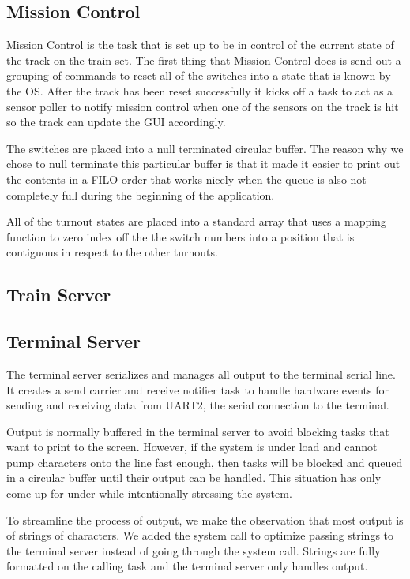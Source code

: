 \documentclass[pdftex,10pt,a4paper]{article}
\begin{document}
\subsection*{Mission Control}

Mission Control is the task that is set up to be in control of the current
state of the track on the train set. The first thing that Mission Control
does is send out a grouping of commands to reset all of the switches into a
state that is known by the OS. After the track has been reset successfully
it kicks off a task to act as a sensor poller to notify mission control when
one of the sensors on the track is hit so the track can update the GUI
accordingly.

The switches are placed into a null terminated circular buffer. The reason why
we chose to null terminate this particular buffer is that it made it easier to
print out the contents in a FILO order that works nicely when the queue is
also not completely full during the beginning of the application.

All of the turnout states are placed into a standard array that uses a mapping
function to zero index off the the switch numbers into a position that is
contiguous in respect to the other turnouts.

\subsection*{Train Server}

\subsection*{Terminal Server}

The terminal server serializes and manages all output to the terminal
serial line. It creates a send carrier and receive notifier task to
handle hardware events for sending and receiving data from UART2, the
serial connection to the terminal.

Output is normally buffered in the terminal server to avoid blocking
tasks that want to print to the screen. However, if the system is
under load and cannot pump characters onto the line fast enough, then
tasks will be blocked and queued in a circular buffer until their
output can be handled. This situation has only come up for under while
intentionally stressing the system.

To streamline the process of output, we make the observation that most
output is of strings of characters. We added the  system
call to optimize passing strings to the terminal server instead of
going through the  system call. Strings are fully formatted
on the calling task and the terminal server only handles output.
\end{document}
